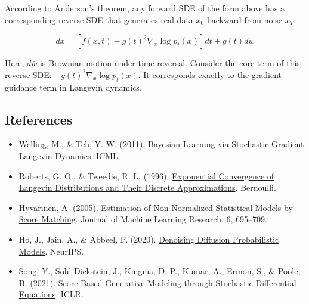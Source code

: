 According to Anderson's theorem, any forward SDE of the form above has a corresponding reverse SDE that generates real data \(x_0\) backward from noise \(x_T\):

\[
dx=\left[f(x,t)-g(t)^2\nabla_x\log p_t(x)\right]dt+g(t)d\bar{w}
\]

Here, \(d\bar{w}\) is Brownian motion under time reversal. Consider the core term of this reverse SDE: \(-g(t)^2\nabla_x\log p_t(x)\). It corresponds exactly to the gradient-guidance term in Langevin dynamics.

\FloatBarrier
{}
\hypertarget{references-129}{%
\subsection{References}\label{references-129}}

\vspace{0.25em}
\begin{itemize}
\tightlist
\item
  Welling, M., \& Teh, Y. W. (2011). \href{https://www.stats.ox.ac.uk/~teh/research/compstats/WelTeh2011a.pdf}{Bayesian Learning via Stochastic Gradient Langevin Dynamics}. ICML.
\item
  Roberts, G. O., \& Tweedie, R. L. (1996). \href{https://doi.org/10.2307/3318418}{Exponential Convergence of Langevin Distributions and Their Discrete Approximations}. Bernoulli.
\item
  Hyvärinen, A. (2005). \href{https://www.jmlr.org/papers/v6/hyvarinen05a.html}{Estimation of Non-Normalized Statistical Models by Score Matching}. Journal of Machine Learning Research, 6, 695--709.
\item
  Ho, J., Jain, A., \& Abbeel, P. (2020). \href{https://arxiv.org/abs/2006.11239}{Denoising Diffusion Probabilistic Models}. NeurIPS.
\item
  Song, Y., Sohl-Dickstein, J., Kingma, D. P., Kumar, A., Ermon, S., \& Poole, B. (2021). \href{https://arxiv.org/abs/2011.13456}{Score-Based Generative Modeling through Stochastic Differential Equations}. ICLR.
\end{itemize}

\clearpage
